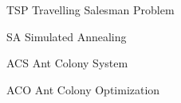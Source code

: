 \begin{abbreviations}
	\item[TSP] Travelling Salesman Problem
	\item[SA] Simulated Annealing
	\item[ACS] Ant Colony System
	\item[ACO] Ant Colony Optimization
\end{abbreviations}

